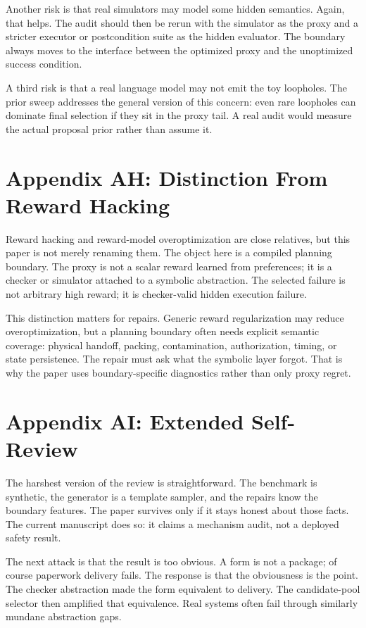 \documentclass{article}
\begin{document}
Another risk is that real simulators may model some hidden semantics. Again,
that helps. The audit should then be rerun with the simulator as the proxy and
a stricter executor or postcondition suite as the hidden evaluator. The
boundary always moves to the interface between the optimized proxy and the
unoptimized success condition.

A third risk is that a real language model may not emit the toy loopholes. The
prior sweep addresses the general version of this concern: even rare loopholes
can dominate final selection if they sit in the proxy tail. A real audit would
measure the actual proposal prior rather than assume it.

\section*{Appendix AH: Distinction From Reward Hacking}

Reward hacking and reward-model overoptimization are close relatives, but this
paper is not merely renaming them. The object here is a compiled planning
boundary. The proxy is not a scalar reward learned from preferences; it is a
checker or simulator attached to a symbolic abstraction. The selected failure
is not arbitrary high reward; it is checker-valid hidden execution failure.

This distinction matters for repairs. Generic reward regularization may reduce
overoptimization, but a planning boundary often needs explicit semantic
coverage: physical handoff, packing, contamination, authorization, timing, or
state persistence. The repair must ask what the symbolic layer forgot. That is
why the paper uses boundary-specific diagnostics rather than only proxy regret.

\section*{Appendix AI: Extended Self-Review}

The harshest version of the review is straightforward. The benchmark is
synthetic, the generator is a template sampler, and the repairs know the
boundary features. The paper survives only if it stays honest about those
facts. The current manuscript does so: it claims a mechanism audit, not a
deployed safety result.

The next attack is that the result is too obvious. A form is not a package; of
course paperwork delivery fails. The response is that the obviousness is the
point. The checker abstraction made the form equivalent to delivery. The
candidate-pool selector then amplified that equivalence. Real systems often
fail through similarly mundane abstraction gaps.
\end{document}
